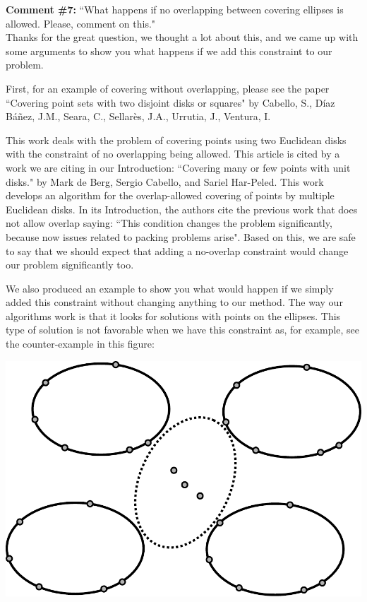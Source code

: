 		\textbf{Comment \#7:} ``What happens if no overlapping between covering ellipses is allowed. Please, comment on this."
		\\
		
		Thanks for the great question, we thought a lot about this, and we came up with some arguments to show you what happens if we add this constraint to our problem.
		
		First, for an example of covering without overlapping, please see the paper ``Covering point sets with two disjoint disks or squares" by Cabello, S., Díaz Báñez, J.M., Seara, C., Sellarès, J.A., Urrutia, J., Ventura, I.
		
		This work deals with the problem of covering points using two Euclidean disks with the constraint of no overlapping being allowed. This article is cited by a work we are citing in our Introduction: ``Covering many or few points with unit disks." by Mark de Berg, Sergio Cabello, and Sariel Har-Peled. 
		This work develops an algorithm for the overlap-allowed covering of points by multiple Euclidean disks. In its Introduction, the authors cite the previous work that does not allow overlap saying: ``This condition changes the problem significantly, because now issues related to packing problems arise". 
		Based on this, we are safe to say that we should expect that adding a no-overlap constraint would change our problem significantly too.
		
		We also produced an example to show you what would happen if we simply added this constraint without changing anything to our method. 
		The way our algorithms work is that it looks for solutions with points on the ellipses. This type of solution is not favorable when we have this constraint as, for example, see the counter-example in this figure:  

		\includegraphics[scale=.6]{figures/answer-to-reviewer-2}

